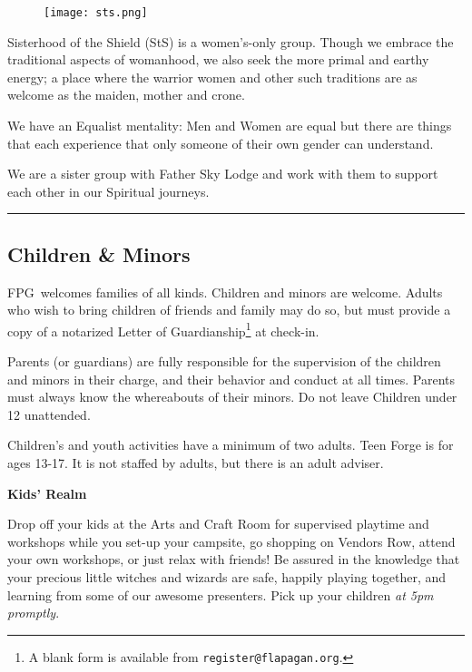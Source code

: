 \documentclass[9pt,twoside,openright,final,article]{memoir}
\def\fpg{{\beltanefamily FPG\ }}
\let\oldsection=\section
\renewcommand{\section}[1]{%
  \vspace{3pt}%
  \needspace{1in}%
  { \hrule } \nopagebreak %
  \begin{center}\oldsection{#1}\end{center}\nopagebreak{}}
\renewcommand{\subsection}[1]{%
  \vspace{6pt}%
  \needspace{1.25in}%
  \begin{center}\textbf{\Large \beltanefamily #1}\end{center}

  \nopagebreak}
\begin{document}
\begin{multicols}{2}
  \begingroup
  \setlength{\columnsep}{6pt}%
  \begin{wrapfigure}{l}{.4\columnwidth}
    \texttt{[image: sts.png]}
  \end{wrapfigure}

  Sisterhood of the Shield (StS) is a women's-only group. Though we
  embrace the traditional aspects of womanhood, we also seek the more
  primal and earthy energy; a place where the warrior women and other
  such traditions are as welcome as the maiden, mother and crone.

  We have an Equalist mentality: Men and Women are equal but there are
  things that each experience that only someone of their own gender can
  understand.

  We are a sister group with Father Sky Lodge and work with them to
  support each other in our Spiritual journeys.

  \endgroup

  \section{Children \& Minors}

  \fpg welcomes families of all  kinds. Children and minors are welcome.
  Adults who wish to bring children of friends and family may do so, but
  must provide a  copy of a notarized  Letter of Guardianship\footnote{A
    blank  form is  available  from \texttt{register@flapagan.org}.}  at
  check-in.

  Parents (or  guardians) are fully  responsible for the  supervision of
  the  children and  minors  in  their charge,  and  their behavior  and
  conduct  at all  times. Parents  must always  know the  whereabouts of
  their minors. Do not leave Children under 12 unattended.

  Children's and youth activities have a minimum of two adults.  Teen
  Forge is for ages 13-17. It is not staffed by adults, but there is
  an adult adviser.


  \subsection{Kids' Realm}

  Drop off your kids at the  Arts and Craft Room for supervised playtime
  and workshops while  you set-up your campsite, go  shopping on Vendors
  Row, attend your own workshops, or just relax with friends! Be assured
  in the  knowledge that  your precious little  witches and  wizards are
  safe, happily playing together, and  learning from some of our awesome
  presenters. Pick up your children \emph{at 5pm promptly}.



\end{multicols}
\end{document}
